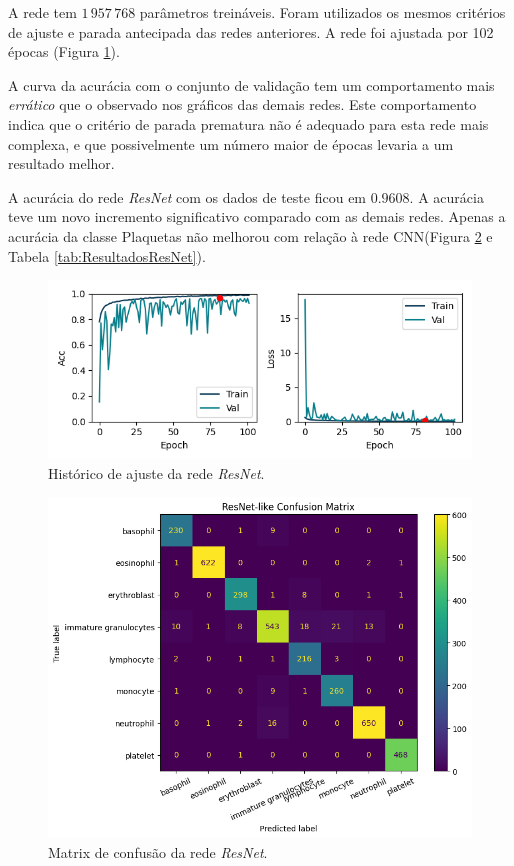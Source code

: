 \documentclass[final,5p]{elsarticle}
\numberwithin{equation}{section}
\begin{document}
    A rede tem $1\,957\,768$ parâmetros treináveis. Foram utilizados os mesmos critérios de ajuste e parada antecipada das redes anteriores. A rede foi ajustada por 102 épocas (Figura \ref{fig:HistoricoResNet}).

    A curva da acurácia com o conjunto de validação tem um comportamento mais \emph{errático} que o observado nos gráficos das demais redes. Este comportamento indica que o critério de parada prematura não é adequado para esta rede mais complexa, e que possivelmente um número maior de épocas levaria a um resultado melhor.

    A acurácia do rede \emph{ResNet} com os dados de teste ficou em $0.9608$. A acurácia teve um novo incremento significativo comparado com as demais redes. Apenas a acurácia da classe Plaquetas não melhorou com relação à rede CNN(Figura \ref{fig:MatrizConfusaoResNet} e Tabela \ref{tab:ResultadosResNet}).

    \begin{figure}[hbt!]
        \includegraphics[width=0.95\columnwidth]{ResNet_history_cropped.png}
        \caption{Histórico de ajuste da rede \emph{ResNet}.}\label{fig:HistoricoResNet}
    \end{figure}

    \begin{figure}[hbt!]
        \includegraphics[width=0.95\columnwidth]{ResNet_cm.png}
        \caption{Matrix de confusão da rede \emph{ResNet}.}\label{fig:MatrizConfusaoResNet}
    \end{figure}
\end{document}
